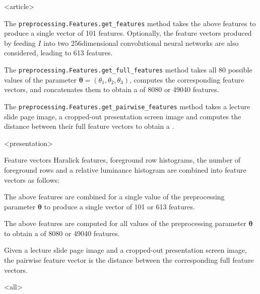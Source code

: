\mode
<article>

The \texttt{preprocessing.Features.get\_features} method takes the above
features to produce a single vector of 101 features. Optionally, the 
feature vectors produced by feeding $I$ into two 256dimensional 
convolutional neural networks are also considered, leading to 613 features.

The \texttt{preprocessing.Features.get\_full\_features} method takes all
80 possible values of the parameter
$\bm\theta=(\theta_1,\theta_2,\theta_3)$, computes the corresponding feature
vectors, and concatenates them to obtain a  of 8080 or 49040
features.

The \texttt{preprocessing.Features.get\_pairwise\_features} method takes
a lecture slide page image, a cropped-out presentation screen image and
computes the  distance between their full feature vectors to obtain a
.

\mode
<presentation>

\begin{frame}{Feature vectors}
Haralick features, foreground row histograms, the number of foreground rows
and a relative luminance histogram are combined into feature vectors as
follows:
\begin{description}[<+->]
  \item[Feature vectors]
    The above features are combined for a single value of the preprocessing
    parameter $\bm\theta$ to produce a single vector of 101 or 613 features.

  \item[Full feature vectors]
    The above features are computed for all values of the preprocessing parameter
    $\bm\theta$ to obtain a  of 8080 or 49040 features.

  \item[Pairwise feature vectors]
    Given a lecture slide page image and a cropped-out presentation screen
    image, the pairwise feature vector is the  distance between the
    corresponding full feature vectors.
\end{description}
\end{frame}

\mode
<all>

